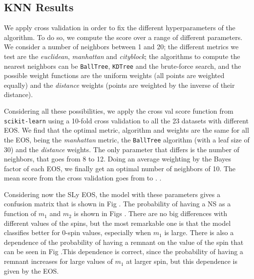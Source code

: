 \subsection{KNN Results}



We apply cross validation in order to fix the different hyperparameters of the algorithm.  To do so, we compute the score over a range of different parameters. We consider a number of neighbors between 1 and 20; the different metrics we test are the \textit{euclidean}, \textit{manhattan} and \textit{cityblock}; the algorithms to compute the nearest neighbors can be \texttt{BallTree}, \texttt{KDTree} and the brute-force search, and the possible weight functions are the uniform weights (all points are weighted equally) and the \textit{distance} weights (points are weighted by the inverse of their distance). 

Considering all these possibilities, we apply the cross val score function from \texttt{scikit-learn} using a 10-fold cross validation to all the 23 datasets with different EOS.  We find that the optimal metric, algorithm and weights are the same for all the EOS, being the  \textit{manhattan} metric, the \texttt{BallTree} algorithm (with a leaf size of 30) and the \textit{distance} weights. The only parameter that differs is the number of neighbors, that goes from 8 to 12. Doing an average weighting by the Bayes factor of each EOS, we finally get an optimal number of neighbors of 10. The mean score from the cross validation goes from  to . .  


Considering now the SLy EOS,  the model with these parameters gives a confusion matrix that is shown in Fig .  The probability of having a NS as a function of $m_1$ and $m_2$  is shown in Figs . There are no big differences with different values of the spins, but the most remarkable one is that the model classifies better for 0-spin values, especially when $m_1$ is large.  There is also a dependence of the probability of having a remnant on the value of the spin that can be seen in Fig .This dependence is correct, since the probability of having a remnant increases for large values of $m_1$ at larger spin, but this dependence is given by the EOS. 


